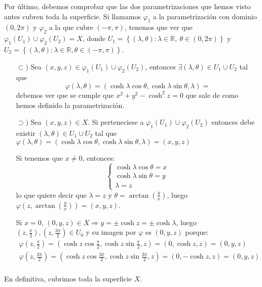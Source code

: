 Por último, debemos comprobar que las dos parametrizaciones que hemos visto
antes cubren toda la superficie. Si llamamos $\varphi_1$ a la parametrización
con dominio $\left( 0, 2 \pi \right)$ y $\varphi_2$ a la que cubre $\left( -\pi,
\pi \right)$, tenemos que ver que $\varphi_1\left( U_1 \right) \cup
\varphi_2\left( U_2 \right) = X$, donde $U_1 = \left\{ \left( \lambda, \theta
    \right) : \lambda \in \mathbb{R},\ \theta \in \left( 0, 2 \pi \right)
    \right\}$ y $U_2 = \left\{ \left( \lambda, \theta \right) : \lambda \in
    \mathbb{R}, \theta \in \left( -\pi, \pi \right) \right\}$.
\begin{itemize}
\item[$\subset)$] Sea $\left( x, y, z \right) \in \varphi_1\left( U_1 \right)
    \cup \varphi_2\left( U_2 \right)$, entonces $\exists \left( \lambda, \theta
    \right) \in U_1 \cup U_2$ tal que 
    \[
        \varphi\left( \lambda, \theta \right) =
        \left( \cosh \lambda \cos \theta, \cosh \lambda \sin \theta, \lambda \right)
        = 
    \]
    debemos ver que se cumple que $x^2 + y^2 - \cosh^2 z = 0$ que sale de como
    hemos definido la parametrización. 

\item[$\supset)$] Sea $\left( x, y, z \right) \in X$. Si perteneciese a
    $\varphi_1\left( U_1 \right) \cup \varphi_2\left( U_2 \right)$ entonces debe
    existir $\left( \lambda, \theta \right) \in U_1 \cup U_2$ tal que
    $\varphi\left( \lambda, \theta \right) = \left( \cosh \lambda \cos \theta,
    \cosh \lambda \sin \theta, \lambda \right) = \left( x, y, z \right)$

    Si tenemos que $x \neq  0$, entonces:
    \[
    \begin{cases}
        \cosh \lambda \cos \theta = x\\
        \cosh \lambda \sin \theta = y\\
        \lambda = z
    \end{cases}
    \]
    lo que quiere decir que $\lambda = z$ y $\theta = \arctan\left( \frac{y}{x}
    \right)$, luego $\varphi\left( z, \arctan\left( \frac{y}{x} \right) \right)
    = \left( x, y, z \right)$.

    Si $x = 0$, $\left( 0, y, z \right) \in X \Rightarrow y = \pm \cosh z = \pm
    \cosh \lambda$, luego $\left( z, \frac{\pi}{2} \right), \left( z,
    \frac{3 \pi}{2} \right) \in U_0$ y su imagen por $\varphi$ es $\left( 0, y,
    z\right)$ porque: 
    \begin{gather*}
        \varphi\left( z, \frac{\pi}{2} \right) = \left( \cosh z \cos
        \frac{\pi}{2}, \cosh z \sin \frac{\pi}{2}, z \right) = \left( 0, \cosh
        z, z \right) = \left( 0, y, z \right)\\ 
        \varphi\left( z, \frac{3\pi}{2}
        \right) = \left( \cosh z \cos \frac{3\pi}{2}, \cosh z \sin \frac{3\pi}{2}, z
        \right) = \left( 0, -\cosh z, z \right) = \left( 0, y, z \right)\\
    \end{gather*}
\end{itemize}
En definitiva, cubrimos toda la superficie $X$.
